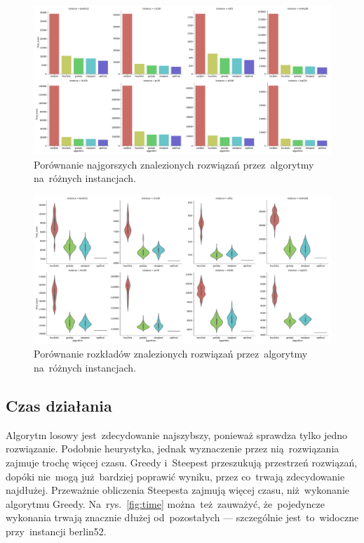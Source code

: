 \begin{figure}
\begin{center}
\includegraphics[width=1.0\textwidth]{graphs/score_comparison_bar_max.pdf}
\end{center}
\caption{Porównanie najgorszych znalezionych rozwiązań przez~algorytmy na~różnych instancjach.}
\label{fig:worst}
\end{figure}

\begin{figure}
\begin{center}
\includegraphics[width=1.0\textwidth]{graphs/score_comparison_violin.pdf}
\end{center}
\caption{Porównanie rozkładów znalezionych rozwiązań przez~algorytmy na~różnych instancjach.}
\label{fig:distribution}
\end{figure}

\subsection{Czas działania}

Algorytm losowy jest~zdecydowanie najszybszy, ponieważ sprawdza tylko jedno rozwiązanie. Podobnie heurystyka, jednak wyznaczenie przez nią~rozwiązania zajmuje trochę więcej czasu. Greedy i~Steepest przeszukują przestrzeń rozwiązań, dopóki nie~mogą już~bardziej poprawić wyniku, przez co~trwają zdecydowanie najdłużej. Przeważnie obliczenia Steepesta zajmują więcej czasu, niż~wykonanie algorytmu Greedy. Na~rys.~\ref{fig:time} można~też~zauważyć, że~pojedyncze wykonania trwają znacznie dłużej od~pozostałych --- szczególnie jest~to~widoczne przy~instancji berlin52.

